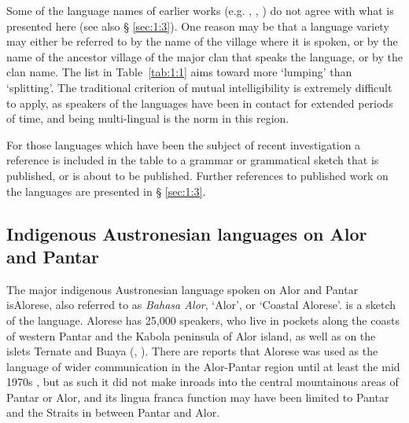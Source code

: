 Some of the language names of earlier works (e.g. \citealt{Stokhof1975}, \citealt{GrimesEtAl1997}, \citealt{LewisEtAl2013}) do not agree with what is presented here (see also {\S} \ref{sec:1:3}). One reason may be that a language variety may either be referred to by the name of the village where it is spoken, or by the name of the ancestor village of the major clan that speaks the language, or by the clan name. The list in Table~\ref{tab:1:1} aims toward more `lumping' than `splitting'. The traditional criterion of mutual intelligibility is extremely difficult to apply, as speakers of the languages have been in contact for extended periods of time, and being multi-lingual is the norm in this region.

For those languages which have been the subject of recent investigation a reference is included in the table to a grammar or grammatical sketch that is published, or is about to be published. Further
references to published work on the languages are presented in {\S} \ref{sec:1:3}.





\subsection{Indigenous Austronesian languages on Alor and Pantar} \label{sec:1:2.2}
The major indigenous Austronesian language spoken on Alor and Pantar is\linebreak Alorese, also referred to as \textit{Bahasa Alor}, `Alor', or `Coastal Alorese'. \citet{Klamer2011} is a sketch of the language. Alorese has 25,000 speakers, who live in pockets along the coasts of western Pantar and the Kabola peninsula of Alor island, as well as on the islets Ternate and Buaya (\citealt[8-9]{Stokhof1975}, \citealt{GrimesEtAl1997,Lewis2009}). There are reports that Alorese was used as the language of wider communication in the Alor-Pantar region until at least the mid 1970s \citep[see][8]{Stokhof1975}, but as such it did not make inroads into the central mountainous areas of Pantar or Alor, and its lingua franca function may have been limited to Pantar and the Straits in between Pantar and Alor.

